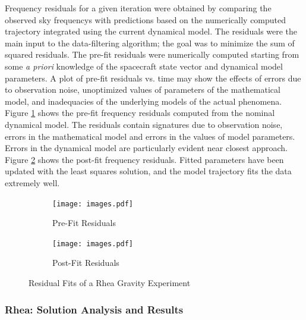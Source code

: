 \documentclass[oneside]{book}
\theoremstyle{mystyle}
\begin{document}
Frequency residuals for a given iteration were obtained by comparing the observed \glspl{sky frequency} with predictions based on the numerically computed trajectory integrated using the current dynamical model. The residuals were the main input to the data-filtering algorithm; the goal was to minimize the sum of squared residuals. The pre-fit residuals were numerically computed starting from some \textit{a priori} knowledge of the spacecraft state vector and dynamical model parameters. A plot of pre-fit residuals vs. time may show the effects of errors due to observation noise, unoptimized values of parameters of the mathematical model, and inadequacies of the underlying models of the actual phenomena.
Figure \ref{fig:usr_pre_fit_rhea_grav_exp} shows the pre-fit frequency residuals computed from the nominal dynamical model. The residuals contain signatures due to observation noise, errors in the mathematical model and errors in the values of model parameters. Errors in the dynamical model are particularly evident near closest approach. Figure \ref{fig:usr_post_fit_rhea_grav_exp} shows the post-fit frequency residuals. Fitted parameters have been updated with the least squares solution, and the model trajectory fits the  data extremely well.

\begin{figure}[H]
	\centering
	\begin{subfigure}[b]{0.48\textwidth}
	    \texttt{[image: images.pdf]}
	    \caption{\scriptsize Pre-Fit Residuals}
	    \label{fig:usr_pre_fit_rhea_grav_exp}
    \end{subfigure}
    \begin{subfigure}[b]{0.5\textwidth}
        \texttt{[image: images.pdf]}
        \caption{\scriptsize Post-Fit Residuals}
        \label{fig:usr_post_fit_rhea_grav_exp}
    \end{subfigure}
        \caption{Residual Fits of a Rhea Gravity Experiment}
        \label{fig:usr_rhea_grav_exp}
\end{figure}

\subsubsection{\footnotesize Rhea: Solution Analysis and Results}
\end{document}
